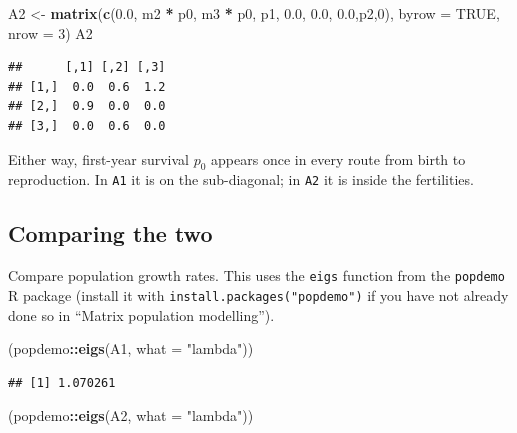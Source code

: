 \documentclass[
  a4paper]{book}
\newenvironment{Shaded}{\begin{snugshade}}{\end{snugshade}}
\newcommand{\AttributeTok}[1]{\textcolor[rgb]{0.13,0.29,0.53}{#1}}
\newcommand{\ConstantTok}[1]{\textcolor[rgb]{0.56,0.35,0.01}{#1}}
\newcommand{\DecValTok}[1]{\textcolor[rgb]{0.00,0.00,0.81}{#1}}
\newcommand{\FloatTok}[1]{\textcolor[rgb]{0.00,0.00,0.81}{#1}}
\newcommand{\FunctionTok}[1]{\textcolor[rgb]{0.13,0.29,0.53}{\textbf{#1}}}
\newcommand{\NormalTok}[1]{#1}
\newcommand{\OtherTok}[1]{\textcolor[rgb]{0.56,0.35,0.01}{#1}}
\newcommand{\SpecialCharTok}[1]{\textcolor[rgb]{0.81,0.36,0.00}{\textbf{#1}}}
\newcommand{\StringTok}[1]{\textcolor[rgb]{0.31,0.60,0.02}{#1}}
\begin{document}
\begin{Shaded}
\begin{Highlighting}[]
\NormalTok{A2 }\OtherTok{\textless{}{-}} \FunctionTok{matrix}\NormalTok{(}\FunctionTok{c}\NormalTok{(}\FloatTok{0.0}\NormalTok{, m2 }\SpecialCharTok{*}\NormalTok{ p0, m3 }\SpecialCharTok{*}\NormalTok{ p0,}
\NormalTok{               p1, }\FloatTok{0.0}\NormalTok{, }\FloatTok{0.0}\NormalTok{,}
               \FloatTok{0.0}\NormalTok{,p2,}\DecValTok{0}\NormalTok{), }\AttributeTok{byrow =} \ConstantTok{TRUE}\NormalTok{, }\AttributeTok{nrow =} \DecValTok{3}\NormalTok{)}
\NormalTok{A2}
\end{Highlighting}
\end{Shaded}

\begin{verbatim}
##      [,1] [,2] [,3]
## [1,]  0.0  0.6  1.2
## [2,]  0.9  0.0  0.0
## [3,]  0.0  0.6  0.0
\end{verbatim}

Either way, first-year survival \(p_0\) appears once in every route from birth to reproduction. In \texttt{A1} it is on the sub-diagonal; in \texttt{A2} it is inside the fertilities.

\subsection{Comparing the two}\label{comparing-the-two}

Compare population growth rates. This uses the \texttt{eigs} function from the \texttt{popdemo} R package (install it with \texttt{install.packages("popdemo")} if you have not already done so in ``Matrix population modelling'').

\begin{Shaded}
\begin{Highlighting}[]
\NormalTok{(popdemo}\SpecialCharTok{::}\FunctionTok{eigs}\NormalTok{(A1, }\AttributeTok{what =} \StringTok{"lambda"}\NormalTok{))}
\end{Highlighting}
\end{Shaded}

\begin{verbatim}
## [1] 1.070261
\end{verbatim}

\begin{Shaded}
\begin{Highlighting}[]
\NormalTok{(popdemo}\SpecialCharTok{::}\FunctionTok{eigs}\NormalTok{(A2, }\AttributeTok{what =} \StringTok{"lambda"}\NormalTok{))}
\end{Highlighting}
\end{Shaded}
\end{document}
